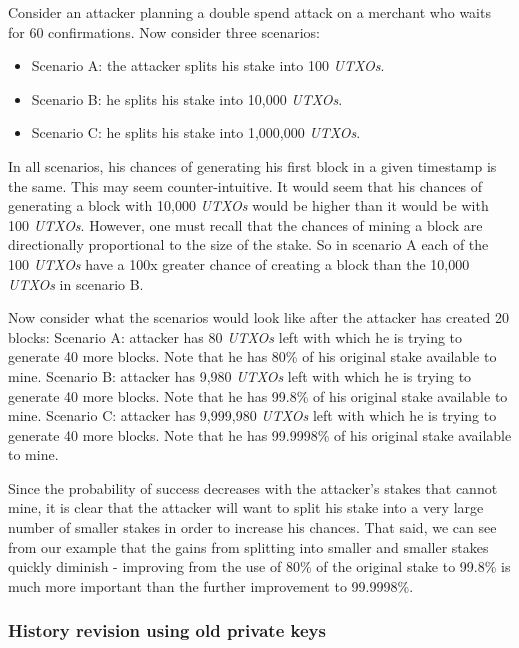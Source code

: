 \documentclass[a4paper,11pt]{article}
\begin{document}
\newpage
Consider an attacker planning a double spend attack on a merchant who waits for 60 confirmations. Now consider three scenarios:
\begin{itemize}
\setlength{\itemsep}{0pt}
\item{Scenario A: the attacker splits his stake into 100 \textit{UTXOs}.}
\item{Scenario B: he splits his stake into 10,000 \textit{UTXOs}.}
\item{Scenario C: he splits his stake into 1,000,000 \textit{UTXOs}.}
\end{itemize}

In all scenarios, his chances of generating his first block in a given timestamp is the same. This may seem counter-intuitive. It would seem that his chances of generating a block with 10,000 \textit{UTXOs} would be higher than it would be with 100 \textit{UTXOs}. However, one must recall that the chances of mining a block are directionally proportional to the size of the stake. So in scenario A each of the 100 \textit{UTXOs} have a 100x greater chance of creating a block than the 10,000 \textit{UTXOs} in scenario B.

Now consider what the scenarios would look like after the attacker has created 20 blocks:
Scenario A: attacker has 80 \textit{UTXOs} left with which he is trying to generate 40 more blocks. Note that he has 80\% of his original stake available to mine.
Scenario B: attacker has 9,980 \textit{UTXOs} left with which he is trying to generate 40 more blocks.
Note that he has 99.8\% of his original stake available to mine.
Scenario C: attacker has 9,999,980 \textit{UTXOs} left with which he is trying to generate 40 more blocks. Note that he has 99.9998\% of his original stake available to mine.

Since the probability of success decreases with the attacker's stakes that cannot mine, it is clear that the attacker will want to split his stake into a very large number of smaller stakes in order to increase his chances. That said, we can see from our example that the gains from splitting into smaller and smaller stakes quickly diminish - improving from the use of 80\% of the original stake to 99.8\% is much more important than the further improvement to 99.9998\%.

\subsubsection{History revision using old private keys}
\label{332}
\end{document}
